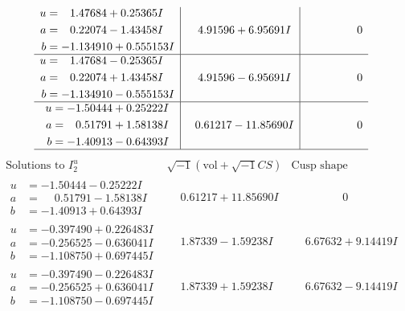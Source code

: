\documentclass[1p]{elsarticle_modified}
\theoremstyle{definition}
\newcommand{\I}{\sqrt{-1}}
\begin{document}
$$\begin{array}{c|c|c}
\begin{aligned}
u &= \phantom{-}1.47684 + 0.25365 I \\
a &= \phantom{-}0.22074 - 1.43458 I \\
b &= -1.134910 + 0.555153 I\end{aligned}
 & \phantom{-}4.91596 + 6.95691 I & \phantom{-0.000000 } 0 \\ \hline\begin{aligned}
u &= \phantom{-}1.47684 - 0.25365 I \\
a &= \phantom{-}0.22074 + 1.43458 I \\
b &= -1.134910 - 0.555153 I\end{aligned}
 & \phantom{-}4.91596 - 6.95691 I & \phantom{-0.000000 } 0 \\ \hline\begin{aligned}
u &= -1.50444 + 0.25222 I \\
a &= \phantom{-}0.51791 + 1.58138 I \\
b &= -1.40913 - 0.64393 I\end{aligned}
 & \phantom{-}0.61217 - 11.85690 I & \phantom{-0.000000 } 0\\
 \hline 
 \end{array}$$\newpage$$\begin{array}{c|c|c}  
\text{Solutions to }I^u_{2}& \I (\text{vol} + \sqrt{-1}CS) & \text{Cusp shape}\\
 \hline 
\begin{aligned}
u &= -1.50444 - 0.25222 I \\
a &= \phantom{-}0.51791 - 1.58138 I \\
b &= -1.40913 + 0.64393 I\end{aligned}
 & \phantom{-}0.61217 + 11.85690 I & \phantom{-0.000000 } 0 \\ \hline\begin{aligned}
u &= -0.397490 + 0.226483 I \\
a &= -0.256525 - 0.636041 I \\
b &= -1.108750 + 0.697445 I\end{aligned}
 & \phantom{-}1.87339 - 1.59238 I & \phantom{-}6.67632 + 9.14419 I \\ \hline\begin{aligned}
u &= -0.397490 - 0.226483 I \\
a &= -0.256525 + 0.636041 I \\
b &= -1.108750 - 0.697445 I\end{aligned}
 & \phantom{-}1.87339 + 1.59238 I & \phantom{-}6.67632 - 9.14419 I \\ \hline\begin{aligned}

\end{aligned}
\end{array}$$
\end{document}
